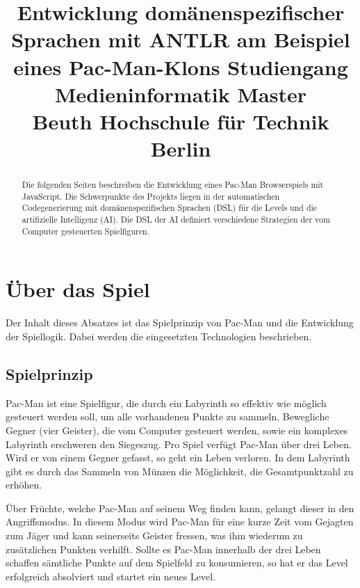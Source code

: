 \documentclass[conference]{IEEEtran}
\begin{document}
\title{%
  Entwicklung domänenspezifischer Sprachen mit ANTLR am Beispiel eines Pac-Man-Klons\bigbreak
  \large Studiengang Medieninformatik Master\\Beuth Hochschule für Technik Berlin}


\author{
\and
{}
\and
{}
}

\maketitle

\lstset{%
  basicstyle=\footnotesize\ttfamily
  }
\begin{abstract}
Die folgenden Seiten beschreiben die Entwicklung eines Pac-Man Browserspiels mit JavaScript. Die Schwerpunkte des Projekts liegen in der automatischen Codegenerierung mit domänenspezifischen Sprachen (DSL) für die Levels und die artifizielle Intelligenz (AI). Die DSL der AI definiert verschiedene Strategien der vom  Computer gesteuerten Spielfiguren.
\end{abstract}

\IEEEpeerreviewmaketitle



\section{Über das Spiel}

Der Inhalt dieses Absatzes ist das Spielprinzip von Pac-Man und die Entwicklung der Spiellogik. Dabei werden die eingesetzten Technologien beschrieben.

\subsection{Spielprinzip}

Pac-Man ist eine Spielfigur, die durch ein Labyrinth so effektiv wie möglich gesteuert werden soll, um alle vorhandenen Punkte zu sammeln. Bewegliche Gegner (vier Geister), die vom Computer gesteuert werden, sowie ein komplexes Labyrinth erschweren den Siegeszug. Pro Spiel verfügt Pac-Man über drei Leben. Wird er von einem Gegner gefasst, so geht ein Leben verloren. In dem Labyrinth gibt es durch das Sammeln von Münzen die Möglichkeit, die Gesamtpunktzahl zu erhöhen.

Über Früchte, welche Pac-Man auf seinem Weg finden kann, gelangt dieser in den Angriffsmodus. In diesem Modus wird Pac-Man für eine kurze Zeit vom Gejagten zum Jäger und kann seinerseits Geister fressen, was ihm wiederum zu zusätzlichen Punkten verhilft. Sollte es Pac-Man innerhalb der drei Leben schaffen sämtliche Punkte auf dem Spielfeld zu konsumieren, so hat er das Level erfolgreich absolviert und startet ein neues Level.
\end{document}
